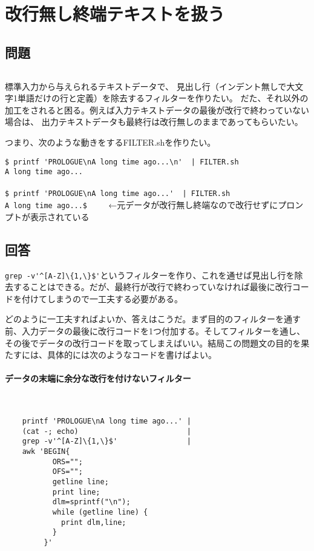 \section{改行無し終端テキストを扱う}
\label{recipe:nonLFterminated}

\subsection*{問題}
\noindent
$\!\!\!\!\!$
\begin{grshfboxit}{160.0mm}
	標準入力から与えられるテキストデータで、
	見出し行（インデント無しで大文字1単語だけの行と定義）を除去するフィルターを作りたい。
	だた、それ以外の加工をされると困る。例えば入力テキストデータの最後が改行で終わっていない場合は、
	出力テキストデータも最終行は改行無しのままであってもらいたい。

	つまり、次のような動きをするFILTER.shを作りたい。
	\begin{screen}
		\verb!$ printf 'PROLOGUE\nA long time ago...\n'  | FILTER.sh! \return \\
		\verb!A long time ago...! \\
		\verb!! \\
		\verb!$ printf 'PROLOGUE\nA long time ago...'  | FILTER.sh! \return \\
		\verb!A long time ago...$ !　　←元データが改行無し終端なので改行せずにプロンプトが表示されている
	\end{screen}
\end{grshfboxit}

\subsection*{回答}
\verb|grep -v'^[A-Z]\{1,\}$'|というフィルターを作り、これを通せば見出し行を除去することはできる。だが、最終行が改行で終わっていなければ最後に改行コードを付けてしまうので一工夫する必要がある。

どのように一工夫すればよいか、答えはこうだ。まず目的のフィルターを通す前、入力データの最後に改行コードを1つ付加する。そしてフィルターを通し、その後でデータの改行コードを取ってしまえばいい。結局この問題文の目的を果たすには、具体的には次のようなコードを書けばよい。

\paragraph{データの末端に余分な改行を付けないフィルター} 　\\
\begin{frameboxit}{160.0mm}
\begin{verbatim}
	printf 'PROLOGUE\nA long time ago...' |
	(cat -; echo)                         |
	grep -v'^[A-Z]\{1,\}$'                |
	awk 'BEGIN{
	       ORS="";
	       OFS="";
	       getline line;
	       print line;
	       dlm=sprintf("\n");
	       while (getline line) {
	         print dlm,line;
	       }
	     }'
\end{verbatim}
\end{frameboxit}

